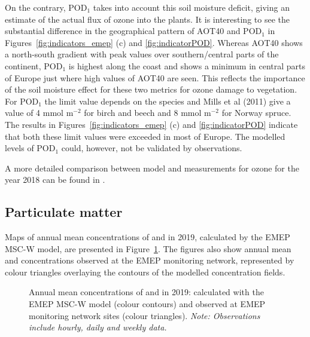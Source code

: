 On the contrary, POD$_1$ takes into account this soil moisture deficit, giving an estimate of the actual flux of ozone into the plants. It is interesting to see the substantial difference in the geographical pattern of AOT40 and POD$_1$ in Figures~\ref{fig:indicators_emep} (c) and \ref{fig:indicatorPOD}. Whereas AOT40 shows a north-south gradient with peak values over southern/central parts of the continent, POD$_1$ is highest along the coast and shows a minimum in central parts of Europe just where high values of AOT40 are seen. This reflects the importance of the soil moisture effect for these two metrics for ozone damage to vegetation. For POD$_1$ the limit value depends on the species and Mills et al (2011) give a value of 4 mmol m$^{-2}$ for birch and beech and 8 mmol m$^{-2}$ for Norway spruce. The results in Figures~\ref{fig:indicators_emep} (c) and \ref{fig:indicatorPOD} indicate that both these limit values were exceeded in most of Europe. The modelled levels of POD$_1$ could, however, not be validated by observations. 

A more detailed comparison between model and measurements for ozone for the year 2018 can be found in \cite{WEB2020:O3}.



\subsection{Particulate matter} 
\label{subs:PMstatus}

Maps of annual mean concentrations of \PM[10] and \PM[2.5] in 2019,
calculated by the EMEP MSC-W model, are presented in
Figure~\ref{fig:PMin2018}. The figures also show annual mean \PM[10]
and \PM[2.5] concentrations observed at the EMEP monitoring network,
represented by colour triangles overlaying the contours of the
modelled concentration fields.

\begin{figure}[H]
  \vspace{0.5cm}
\caption{Annual mean concentrations of \PM[10] and \PM[2.5] in 2019:
  calculated with the EMEP MSC-W model (colour contours) and observed
  at EMEP monitoring network sites (colour triangles). \textit{Note:
    Observations include hourly, daily and weekly data.}}
\label{fig:PMin2018}
\end{figure}



